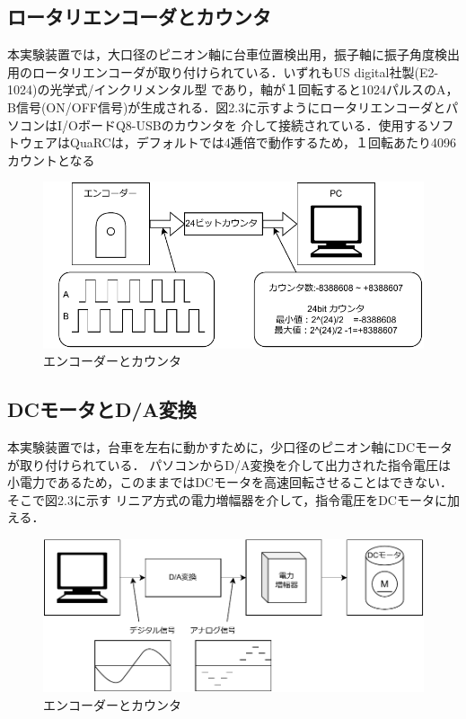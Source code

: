 \subsection{ロータリエンコーダとカウンタ}
本実験装置では，大口径のピニオン軸に台車位置検出用，振子軸に振子角度検出用のロータリエンコーダが取り付けられている．いずれもUS digital社製(E2-1024)の光学式/インクリメンタル型
であり，軸が１回転すると1024パルスのA，B信号(ON/OFF信号)が生成される．図2.3に示すようにロータリエンコーダとパソコンはI/OボードQ8-USBのカウンタを
介して接続されている．使用するソフトウェアはQuaRCは，デフォルトでは4逓倍で動作するため，１回転あたり4096カウントとなる

\begin{figure}[H]
  \centering
  \includegraphics[scale=1]{sozai/encordertokaunnta.pdf}
  \caption{エンコーダーとカウンタ}
\end{figure}

\subsection{DCモータとD/A変換}
本実験装置では，台車を左右に動かすために，少口径のピニオン軸にDCモータが取り付けられている．
パソコンからD/A変換を介して出力された指令電圧は小電力であるため，このままではDCモータを高速回転させることはできない．そこで図2.3に示す
リニア方式の電力増幅器を介して，指令電圧をDCモータに加える．

\begin{figure}[H]
  \centering
  \includegraphics[scale=1]{sozai/DCmotaADhenkan.pdf}
  \caption{エンコーダーとカウンタ}
\end{figure}

